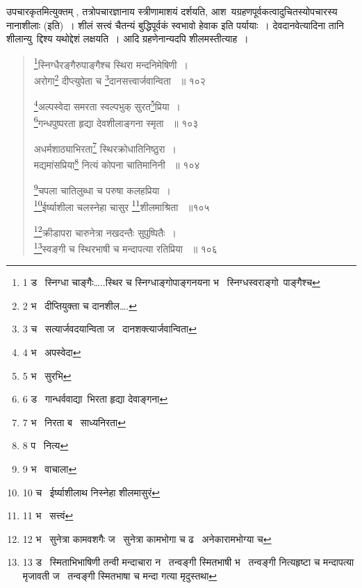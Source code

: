 \documentclass[11pt, openany]{book}
\begin{document}
{\begin{sloppypar}
उपचारकृतमित्युक्तम् , तत्रोपचारज्ञानाय स्त्रीणामाशयं दर्शयति, आश\textendash\ यग्रहणपूर्वकत्वादुचितस्योपचारस्य नानाशीलाः (इति)~। शीलं सत्त्वं चैतन्यं बुद्धिपूर्वकं स्वभावो हेवाक इति पर्यायाः~। देवदानवेत्यादिना तानि शीलान्यु\textendash\ द्दिश्य यथोद्देशं लक्षयति~। आदि ग्रहणेनान्यदपि शीलमस्तीत्याह~। 
\end{sloppypar}

\newpage

\begin{quote}
 {\na \renewcommand{\thefootnote}{1}\footnote{1 ड \textendash\ स्निग्धा चाङ्गैः\ldots ..स्थिर च स्निग्धाङ्गोपाङ्गनयना भ \textendash\ स्निग्धस्वराङ्गो\textendash\ पाङ्गैश्च}स्निग्धैरङ्गैरुपाङ्गैश्च स्थिरा मन्दनिमेषिणी~। \\
अरोगा\renewcommand{\thefootnote}{2}\footnote{2 भ \textendash\ दीप्तियुक्ता च दानशील\ldots .} दीप्त्युपेता च \renewcommand{\thefootnote}{3}\footnote{3 च \textendash\ सत्यार्जवदयान्विता ज \textendash\ दानशक्त्यार्जवान्विता }दानसत्त्वार्जवान्विता ~॥ १०२ 

\renewcommand{\thefootnote}{4}\footnote{4 भ \textendash\ अपस्वेदा}अल्पस्वेदा समरता स्वल्पभुक् सुरत\renewcommand{\thefootnote}{5}\footnote{5 भ \textendash\ सुरभि}प्रिया~।\\ 
\renewcommand{\thefootnote}{6}\footnote{6 ड \textendash\ गान्धर्ववाद्या\textendash\ भिरता हृद्या देवाङ्गना }गन्धपुष्परता हृद्या देवशीलाङ्गना स्मृता ~॥ १०३ 

अधर्मशाठ्याभिरता\renewcommand{\thefootnote}{7}\footnote{7 भ \textendash\ निरता ब \textendash\ साध्यनिरता} स्थिरक्रोधातिनिष्ठुरा~।\\ 
मद्यमांसप्रिया\renewcommand{\thefootnote}{8}\footnote{8 प \textendash\ नित्य} नित्यं कोपना चातिमानिनी ~॥ १०४ 

\renewcommand{\thefootnote}{9}\footnote{9 भ \textendash\ वाचाला}चपला चातिलुब्धा च परुषा कलहप्रिया~।\\ 
\renewcommand{\thefootnote}{10}\footnote{10 च \textendash\ ईर्ष्याशीलाथ निस्नेहा शीलमासुरं }ईर्ष्याशीला चलस्नेहा चासुर \renewcommand{\thefootnote}{11}\footnote{11 भ \textendash\ सत्त्वं}शीलमाश्रिता ~॥१०५ 

\renewcommand{\thefootnote}{12}\footnote{12 भ \textendash\ सुनेत्रा कामवशगैः ज \textendash\ सुनेत्रा कामभोगा च ढ \textendash\ अनेकारामभोग्या च}क्रीडापरा चारुनेत्रा नखदन्तैः सुपुष्पितैः~। \\
\renewcommand{\thefootnote}{13}\footnote{13 ड \textendash\ स्मिताभिभाषिणी तन्वी मन्दाचारा न \textendash\ तन्वङ्गी स्मितभाषी भ \textendash\ तन्वङ्गी नित्यहृष्टा च मन्दापत्या मृजावती ज \textendash\ तन्वङ्गी स्मितभाषा च मन्दा गत्या मृदुस्तथा}स्वङ्गी च स्थिरभाषी च मन्दापत्या रतिप्रिया ~॥ १०६ 

}
\end{quote}}
\end{document}
